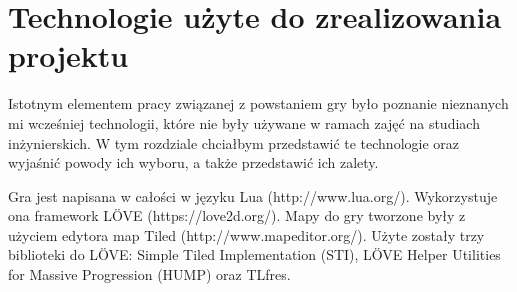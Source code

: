 \chapter{Technologie użyte do zrealizowania projektu}
Istotnym elementem pracy związanej z powstaniem gry było poznanie nieznanych mi 
wcześniej technologii, które nie były używane w ramach zajęć na studiach 
inżynierskich. W tym rozdziale chciałbym przedstawić te technologie oraz 
wyjaśnić powody ich wyboru, a także przedstawić ich zalety.

Gra jest napisana w całości w języku Lua (http://www.lua.org/). 
Wykorzystuje ona framework LÖVE (https://love2d.org/).
Mapy do gry tworzone były z użyciem edytora map Tiled (http://www.mapeditor.org/).
Użyte zostały trzy biblioteki do LÖVE: Simple Tiled Implementation (STI), 
LÖVE Helper Utilities for Massive Progression (HUMP) oraz TLfres.